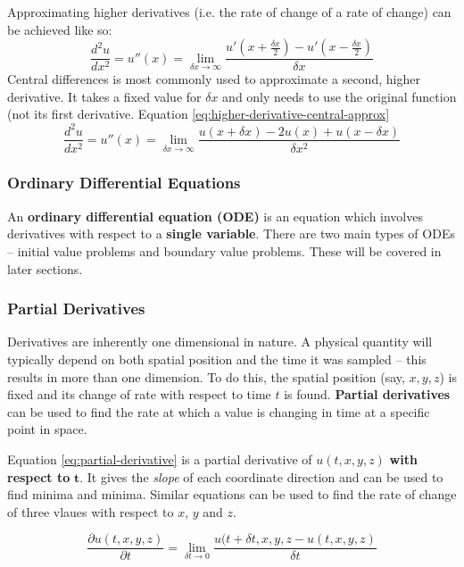 \documentclass{article}
\begin{document}
Approximating higher derivatives (i.e. the rate of change of a rate of change) can be achieved like so:
\begin{equation}
	\frac{d^2u}{dx^2} = u''(x) = \lim_{\delta x \rightarrow \infty} \frac{u'(x + \frac{\delta x}{2}) - u'(x - \frac{\delta x}{2})}{\delta x}
	\label{eq:higher-derivative-approx}
\end{equation}
Central differences is most commonly used to approximate a second, higher derivative. It takes a fixed value for $\delta x$ and only needs to use the original function (not its first derivative. Equation \ref{eq:higher-derivative-central-approx}
\begin{equation}
	\frac{d^2u}{dx^2} = u''(x) = \lim_{\delta x \rightarrow \infty} \frac{u(x + \delta x) - 2u(x) + u(x - \delta x)}{\delta x^2}
	\label{eq:higher-derivative-central-approx}
\end{equation}

\subsubsection{Ordinary Differential Equations}

An \textbf{ordinary differential equation (ODE)} is an equation which involves derivatives with respect to a \textbf{single variable}. There are two main types of ODEs -- initial value problems and boundary value problems. These will be covered in later sections.

\subsubsection{Partial Derivatives}

Derivatives are inherently one dimensional in nature. A physical quantity will typically depend on both spatial position and the time it was sampled -- this results in more than one dimension.  To do this, the spatial position (say, $x, y, z$) is fixed and its change of rate with respect to time $t$ is found. \textbf{Partial derivatives} can be used to find the rate at which a value is changing in time at a specific point in space.

Equation \ref{eq:partial-derivative} is a partial derivative of $u(t, x, y, z)$ \textbf{with respect to }$\mathbf{t}$. It gives the \textit{slope} of each coordinate direction and can be used to find minima and minima. Similar equations can be used to find the rate of change of three vlaues with respect to $x$, $y$ and $z$.

\begin{equation}
	\frac{\partial u(t, x, y, z)}{\partial t} = \lim_{\delta t \rightarrow 0} \frac{u(t + \delta t, x, y, z - u(t, x, y, z)}{\delta t}
	\label{eq:partial-derivative}
\end{equation}
\end{document}
